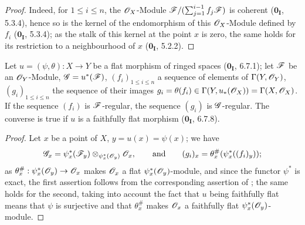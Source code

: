 \begin{proof}
Indeed, for $1\leq i\leq n$, the $\mathscr{O}_X$-Module $\mathscr{F}/(\sum_{j=1}^{i-1}f_j\mathscr{F})$ is coherent ($\mathbf{0_I}$, 5.3.4), hence so is the kernel of the endomorphism of this $\mathscr{O}_X$-Module defined by $f_i$ ($\mathbf{0_I}$, 5.3.4);
as the stalk of this kernel at the point $x$ is zero, the same holds for its restriction to a neighbourhood of $x$ ($\mathbf{0_I}$, 5.2.2).
\end{proof}

\begin{proposition}[15.2.5]
\label{0.15.2.5}
Let $u=(\psi,\theta):X\to Y$ be a flat morphism of ringed spaces ($\mathbf{0_I}$, 6.7.1);
let $\mathscr{F}$ be an $\mathscr{O}_Y$-Module, $\mathscr{G}=u^*(\mathscr{F})$, $(f_i)_{1\leq i\leq n}$ a sequence of elements of $\Gamma(Y,\mathscr{O}_Y)$, $(g_i)_{1\leq i\leq n}$ the sequence of their images $g_i=\theta(f_i)\in\Gamma(Y,u_*(\mathscr{O}_X))=\Gamma(X,\mathscr{O}_X)$.
If the sequence $(f_i)$ is $\mathscr{F}$-regular, the sequence $(g_i)$ is $\mathscr{G}$-regular.
The converse is true if $u$ is a faithfully flat morphism ($\mathbf{0_I}$, 6.7.8).
\end{proposition}

\begin{proof}
Let $x$ be a point of $X$, $y=u(x)=\psi(x)$;
we have
\[
  \mathscr{G}_x=\psi_x^*(\mathscr{F}_y)\otimes_{\psi_x^*(\mathscr{O}_y)}\mathscr{O}_x,
  \qquad\text{and}\qquad
  (g_i)_x=\theta_x^\#(\psi_x^*((f_i)_y));
\]
as $\theta_x^\#:\psi_x^*(\mathscr{O}_y)\to\mathscr{O}_x$ makes $\mathscr{O}_x$ a flat $\psi_x^*(\mathscr{O}_y)$-module, and since the functor $\psi^*$ is exact, the first assertion follows from the corresponding assertion of ;
the same holds for the second, taking into account the fact that $u$ being faithfully flat means that $\psi$ is surjective and that $\theta_x^\#$ makes $\mathscr{O}_x$ a faithfully flat $\psi_x^*(\mathscr{O}_y)$-module.
\end{proof}
